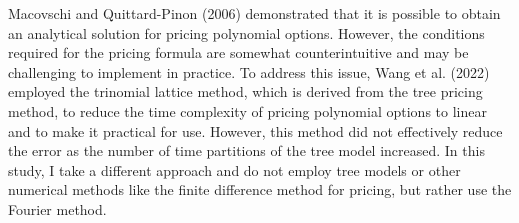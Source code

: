  Macovschi and Quittard-Pinon (2006) demonstrated that it is possible to obtain an analytical solution for pricing polynomial options. However, the conditions required for the pricing formula are somewhat counterintuitive and may be challenging to implement in practice. To address this issue, Wang et al. (2022) employed the trinomial lattice method, which is derived from the tree pricing method, to reduce the time complexity of pricing polynomial options to linear and to make it practical for use. However, this method did not effectively reduce the error as the number of time partitions of the tree model increased. In this study, I take a different approach and do not employ tree models or other numerical methods like the finite difference method for pricing, but rather use the Fourier method. \\
 
